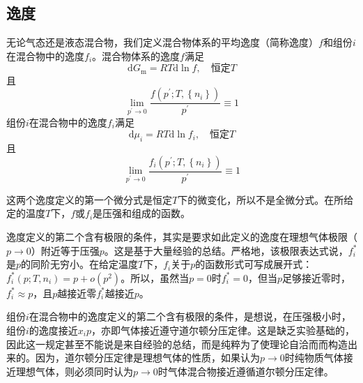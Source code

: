 \documentclass[main.tex]{subfiles}
\begin{document}
\subsection{逸度}
无论气态还是液态混合物，我们定义混合物体系的平均逸度（简称逸度）$f$和组份$i$在混合物中的逸度$f_i$。混合物体系的逸度$f$满足
\[\mathrm{d}G_\text{m}=RT\mathrm{d}\ln f,\quad\text{恒定$T$}\]
且
\[\lim_{p^\prime\to 0}\frac{f\left(p^\prime;T,\left\{n_i\right\}\right)}{p^\prime}\equiv 1\]
组份$i$在混合物中的逸度$f_i$满足
\[\mathrm{d}\mu_i=RT\mathrm{d}\ln f_i,\quad\text{恒定$T$}\]
且
\[\lim_{p^\prime\to 0}\frac{f_i\left(p^\prime;T,\left\{n_i\right\}\right)}{p^\prime}\equiv 1\]

这两个逸度定义的第一个微分式是恒定$T$下的微变化，所以不是全微分式。在所给定的温度$T$下，$f$或$f_i$是压强和组成的函数。

逸度定义的第二个含有极限的条件，其实是要求如此定义的逸度在理想气体极限（$p\rightarrow 0$）附近等于压强$p$。这是基于大量经验的总结。严格地，该极限表达式说，$f_i^*$是$p$的同阶无穷小。在给定温度$T$下，$f_i$关于$p$的函数形式可写成展开式：$f_i^*\left(p;T,n_i\right)=p+o\left(p^2\right)$。所以，虽然当$p=0$时$f_i^*=0$，但当$p$足够接近零时，$f_i^*\approx p$，且$p$越接近零$f_i^*$越接近$p$。

组份$i$在混合物中的逸度定义的第二个含有极限的条件，是想说，在压强极小时，组份$i$的逸度接近$x_i p$，亦即气体接近遵守道尔顿分压定律。这是缺乏实验基础的，因此这一规定甚至不能说是来自经验的总结，而是纯粹为了使理论自洽而而构造出来的。因为，道尔顿分压定律是理想气体的性质，如果认为$p\rightarrow 0$时纯物质气体接近理想气体，则必须同时认为$p\rightarrow 0$时气体混合物接近遵循道尔顿分压定律。
\end{document}
